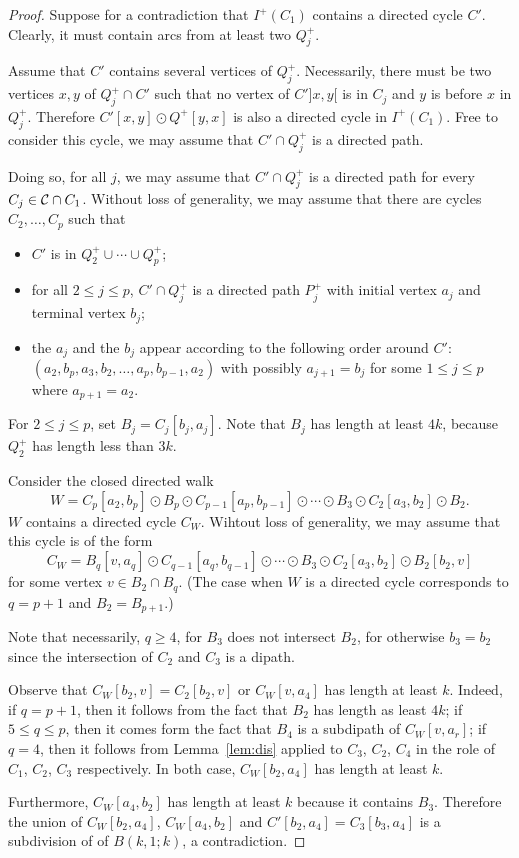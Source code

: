 \documentclass{endm}
\begin{document}
\begin{proof}

Suppose for a contradiction that $I^+(C_1)$  contains a directed cycle $C'$.
Clearly, it must contain arcs from at least two $Q^+_j$.



Assume that $C'$ contains several vertices of $Q^+_j$.
Necessarily, there must be two vertices $x,y$ of $Q^+_j\cap C'$ such that no vertex of $C']x,y[$ is in $C_j$ and  $y$ is before $x$ in $Q^+_j$.
Therefore $C'[x,y]\odot Q^+[y,x]$ is also a directed cycle in $I^+(C_1)$. Free to consider this cycle,
we may assume that $C'\cap Q^+_j$ is a directed path.

Doing so, for all $j$, we may assume that $C'\cap Q^+_j$ is a directed path  for every $C_j\in {\cal C}\cap C_1$.
Without loss of generality, we may assume that there are cycles $C_2, \dots , C_p$ such that
\begin{itemize}
\item $C'$ is in $Q^+_2\cup \cdots  \cup Q^+_p$;
\item for all $2\leq j\leq p$, $C'\cap Q^+_j$ is a directed path $P^+_j$ with initial vertex $a_j$ and terminal vertex $b_j$;
\item the $a_j$ and the $b_j$ appear according to the following order around $C'$: $(a_2, b_p, a_3, b_2, \dots ,   a_p, b_{p-1}, a_2)$ with possibly $a_{j+1}=b_j$ for some $1\leq j \leq p$ where $a_{p+1}=a_2$.
\end{itemize}
For $2\leq j\leq p$, set $B_j=C_j[b_j, a_j]$. Note that $B_j$ has length at least $4k$, because $Q^+_2$ has length less than $3k$.


Consider the closed directed walk $$W=C_p[a_2,b_p]\odot B_p \odot C_{p-1}[a_p, b_{p-1}] \odot  \cdots  \odot  B_3\odot C_2[a_3, b_2]\odot B_2.$$
$W$ contains a directed cycle $C_W$. Wihtout loss of generality, we may assume that this cycle is of the form
$$C_W=B_q[v, a_q] \odot C_{q-1}[a_q, b_{q-1}] \odot  \cdots  \odot  B_3\odot C_2[a_3, b_2]\odot B_2[b_2, v]$$
for some vertex $v\in B_2\cap B_q$. (The case when $W$ is a directed cycle corresponds to $q=p+1$ and $B_2=B_{p+1}$.)

Note that necessarily, $q\geq 4$, for $B_3$ does not intersect $B_2$, for otherwise $b_3=b_2$ since the intersection of $C_2$ and $C_3$ is a dipath.

Observe that $C_W[b_2,v]=C_2[b_2,v]$ or $C_W[v, a_4]$ has length at least $k$.
Indeed, if $q=p+1$, then it follows from the fact that $B_2$ has length as least $4k$; if
$5\leq q\leq p$, then it comes form the fact that $B_4$ is a subdipath of $C_W[v, a_r]$; if $q=4$, then it follows from Lemma~\ref{lem:dis}  applied to $C_3$, $C_2$, $C_4$ in the role of $C_1$, $C_2$, $C_3$ respectively.
In both case, $C_W[b_2, a_4]$ has length at least $k$. 

Furthermore, $C_W[a_4,b_2]$ has length at least $k$ because it contains $B_3$. Therefore the union of
$C_W[b_2, a_4]$, $C_W[a_4,b_2]$ and $C'[b_2,a_4]=C_3[b_3,a_4]$ is a subdivision of of $B(k,1;k)$, a contradiction.
\end{proof}
\end{document}

